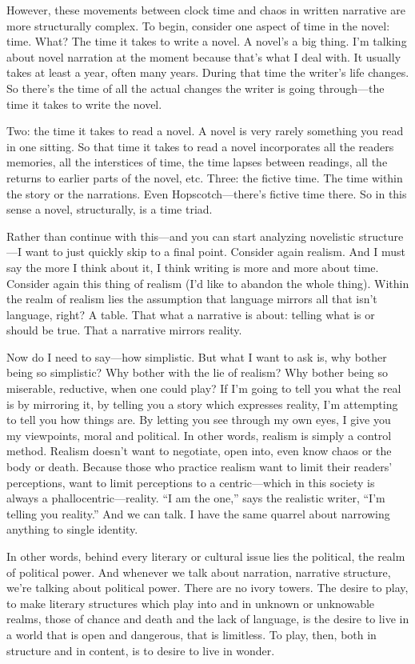 \documentclass[
]{memoir}
\begin{document}
However, these movements between clock time and chaos in written
narrative are more structurally complex. To begin, consider one aspect
of time in the novel: time. What? The time it takes to write a novel. A
novel's a big thing. I'm talking about novel narration at the moment
because that's what I deal with. It usually takes at least a year, often
many years. During that time the writer's life changes. So there's the
time of all the actual changes the writer is going through---the time it
takes to write the novel.

Two: the time it takes to read a novel. A novel is very rarely something
you read in one sitting. So that time it takes to read a novel
incorporates all the readers memories, all the interstices of time, the
time lapses between readings, all the returns to earlier parts of the
novel, etc. Three: the fictive time. The time within the story or the
narrations. Even Hopscotch---there's fictive time there. So in this
sense a novel, structurally, is a time triad.

Rather than continue with this---and you can start analyzing novelistic
structure---I want to just quickly skip to a final point. Consider again
realism. And I must say the more I think about it, I think writing is
more and more about time. Consider again this thing of realism (I'd like
to abandon the whole thing). Within the realm of realism lies the
assumption that language mirrors all that isn't language, right? A
table. That what a narrative is about: telling what is or should be
true. That a narrative mirrors reality.

Now do I need to say---how simplistic. But what I want to ask is, why
bother being so simplistic? Why bother with the lie of realism? Why
bother being so miserable, reductive, when one could play? If I'm going
to tell you what the real is by mirroring it, by telling you a story
which expresses reality, I'm attempting to tell you how things are. By
letting you see through my own eyes, I give you my viewpoints, moral and
political. In other words, realism is simply a control method. Realism
doesn't want to negotiate, open into, even know chaos or the body or
death. Because those who practice realism want to limit their readers'
perceptions, want to limit perceptions to a centric---which in this
society is always a phallocentric---reality. ``I am the one,'' says the
realistic writer, ``I'm telling you reality.'' And we can talk. I have
the same quarrel about narrowing anything to single identity.

In other words, behind every literary or cultural issue lies the
political, the realm of political power. And whenever we talk about
narration, narrative structure, we're talking about political power.
There are no ivory towers. The desire to play, to make literary
structures which play into and in unknown or unknowable realms, those of
chance and death and the lack of language, is the desire to live in a
world that is open and dangerous, that is limitless. To play, then, both
in structure and in content, is to desire to live in wonder.
\end{document}
